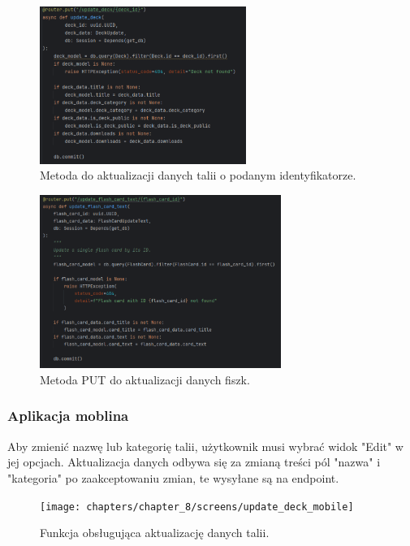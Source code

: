 \begin{figure}[H]
    \centering
    \includegraphics[width=0.6\textwidth]{chapters/chapter_8/screens/update_deck_backend}
    \caption{Metoda do aktualizacji danych talii o podanym identyfikatorze.}
    \label{img:update_deck_backend}
\end{figure}

\begin{figure}[H]
    \centering
    \includegraphics[width=0.7\textwidth]{chapters/chapter_8/screens/update_flash_card_text_backend}
    \caption{Metoda PUT do aktualizacji danych fiszk.}
    \label{img:update_flash_card_backend}
\end{figure}

\subsubsection{Aplikacja moblina}

Aby zmienić nazwę lub kategorię talii, użytkownik musi wybrać widok "Edit" w jej opcjach. Aktualizacja danych odbywa się za zmianą treści pól "nazwa" i "kategoria" po zaakceptowaniu zmian, te wysyłane są na endpoint.

\begin{figure}[H]
    \centering
    \texttt{[image: chapters/chapter\_8/screens/update\_deck\_mobile]}
    \caption{Funkcja obsługująca aktualizację danych talii.}
    \label{img:update_deck_mobile}
\end{figure}

